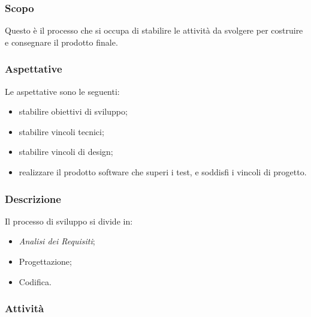 		\subsubsection{Scopo}Questo è il processo che si occupa di stabilire le attività da svolgere per costruire e consegnare il prodotto finale.
		\subsubsection{Aspettative}
		Le aspettative sono le seguenti:
			\begin{itemize}
				\item stabilire obiettivi di sviluppo;
				\item stabilire vincoli tecnici;
				\item stabilire vincoli di design;
				\item realizzare il prodotto software che superi i test, e soddisfi i vincoli di progetto.
			\end{itemize}
		\subsubsection{Descrizione}
			Il processo di sviluppo si divide in:
				\begin{itemize}
					\item \textit{Analisi dei Requisiti};
					\item Progettazione;
					\item Codifica.
				\end{itemize}
		\subsubsection{Attività}
